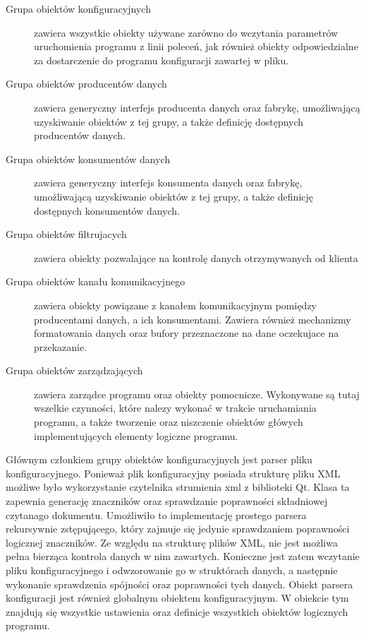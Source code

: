 \begin{description}
\item[Grupa obiektów konfiguracyjnych] zawiera wszystkie obiekty
  używane zarówno do wczytania parametrów uruchomienia programu z
  linii poleceń, jak również obiekty odpowiedzialne za dostarczenie do
  programu konfiguracji zawartej w pliku.
\item[Grupa obiektów producentów danych] zawiera generyczny interfejs
  producenta danych oraz fabrykę, umożliwającą uzyskiwanie obiektów z tej
  grupy, a także definicję dostępnych producentów danych.
\item[Grupa obiektów konsumentów danych] zawiera generyczny interfejs
  konsumenta danych oraz fabrykę, umożliwającą uzyskiwanie obiektów z tej
  grupy, a także definicję dostępnych konsumentów danych.
\item[Grupa obiektów filtrujacych] zawiera obiekty pozwalające na
  kontrolę danych otrzymywanych od klienta
\item[Grupa obiektów kanału komunikacyjnego] zawiera obiekty powiązane
  z kanałem komunikacyjnym pomiędzy producentami danych, a ich
  konsumentami. Zawiera również mechanizmy formatowania danych oraz
  bufory przeznaczone na dane oczekujace na przekazanie.
\item[Grupa obiektów zarządzających] zawiera zarządce programu oraz
  obiekty pomocnicze. Wykonywane są tutaj wszelkie czynności, które
  nalezy wykonać w trakcie uruchamiania programu, a także tworzenie
  oraz niszczenie obiektów główych implementujących elementy logiczne
  programu.
\end{description}

Głównym członkiem grupy obiektów konfiguracyjnych jest parser pliku
konfiguracyjnego. Ponieważ plik konfiguracyjny posiada strukturę pliku
XML możliwe było wykorzystanie czytelnika strumienia xml z biblioteki
Qt. Klasa ta zapewnia generację znaczników oraz sprawdzanie
poprawności składniowej czytanago dokumentu. Umożliwiło to
implementację prostego parsera rekursywnie zstępującego, który zajmuje
się jedynie sprawdzaniem poprawności logicznej znaczników. Ze względu
na strukturę plików XML, nie jest możliwa pełna bierząca kontrola
danych w nim zawartych. Konieczne jest zatem wczytanie pliku
konfiguracyjnego i odwzorowanie go w struktórach danych, a następnie
wykonanie sprawdzenia spójności oraz poprawności tych danych. Obiekt
parsera konfiguracji jest również globalnym obiektem
konfiguracyjnym. W obiekcie tym znajdują się wszystkie ustawienia oraz
definicje wszystkich obiektów logicznych programu.

